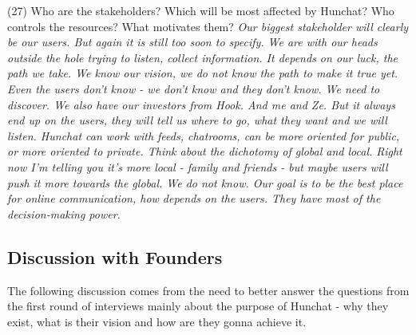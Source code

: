 \documentclass[12pt]{article}
\begin{document}
(27) Who are the stakeholders? Which will be most affected by Hunchat? Who controls the resources? What motivates them? \textit{Our biggest stakeholder will clearly be our users. But again it is still too soon to specify. We are with our heads outside the hole trying to listen, collect information. It depends on our luck, the path we take. We know our vision, we do not know the path to make it true yet. Even the users don't know - we don't know and they don't know. We need to discover. We also have our investors from Hook. And me and Ze. But it always end up on the users, they will tell us where to go, what they want and we will listen. Hunchat can work with feeds, chatrooms, can be more oriented for public, or more oriented to private. Think about the dichotomy of global and local. Right now I'm telling you it's more local - family and friends - but maybe users will push it more towards the global. We do not know. Our goal is to be the best place for online communication, how depends on the users. They have most of the decision-making power.}

\subsection {Discussion with Founders}\label{disc}

The following discussion comes from the need to better answer the questions from the first round of interviews mainly about the purpose of Hunchat - why they exist, what is their vision and how are they gonna achieve it. 
\end{document}
